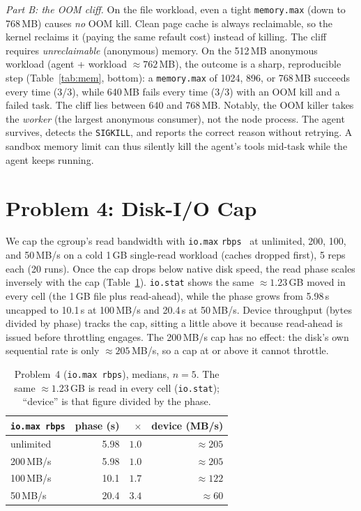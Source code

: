 \documentclass[10pt,conference]{IEEEtran}
\newcommand{\uu}[1]{\,\textsf{#1}}
\begin{document}
\emph{Part B: the OOM cliff.} On the file workload, even a tight
\texttt{memory.max} (down to 768\,MB) causes \emph{no} OOM kill. Clean page
cache is always reclaimable, so the kernel reclaims it (paying the same
refault cost) instead of killing. The cliff requires \emph{unreclaimable}
(anonymous) memory. On the 512\,MB anonymous workload (agent + workload
${\approx}762$\,MB), the outcome is a sharp, reproducible step
(Table~\ref{tab:mem}, bottom): a \texttt{memory.max} of 1024, 896, or 768\,MB
succeeds every time (3/3), while 640\,MB fails every time (3/3) with an OOM
kill and a failed task. The cliff lies between 640 and 768\,MB. Notably, the
OOM killer takes the \emph{worker} (the largest anonymous consumer), not the
node process. The agent survives, detects the \texttt{SIGKILL}, and reports
the correct reason without retrying. A sandbox memory limit can thus
silently kill the agent's tools mid-task while the agent keeps running.

\section{Problem 4: Disk-I/O Cap}
\label{sec:io}

We cap the cgroup's read bandwidth with \texttt{io.max}
\texttt{rbps}~\cite{cgroupv2} at unlimited, 200, 100, and 50\uu{MB/s} on a cold 1\,GB single-read workload
(caches dropped first), 5 reps each (20 runs). Once the cap drops below
native disk speed, the read phase scales inversely with the cap
(Table~\ref{tab:io}). \texttt{io.stat} shows the same ${\approx}1.23$\,GB
moved in every cell (the 1\,GB file plus read-ahead), while the phase grows
from 5.98\uu{s} uncapped to 10.1\uu{s} at 100\uu{MB/s} and 20.4\uu{s} at
50\uu{MB/s}. Device throughput (bytes divided by phase) tracks the cap,
sitting a little above it because read-ahead is issued before throttling
engages. The 200\uu{MB/s} cap has no effect: the disk's own sequential rate
is only ${\approx}205$\uu{MB/s}, so a cap at or above it cannot throttle.

\begin{table}[t]\centering\footnotesize
\setlength{\tabcolsep}{4pt}
\caption{Problem~4 (\texttt{io.max rbps}), medians, $n{=}5$. The same
${\approx}1.23$\,GB is read in every cell (\texttt{io.stat}); ``device''
is that figure divided by the phase.}
\label{tab:io}
\begin{tabular}{@{}lrrr@{}}
\toprule
\texttt{io.max rbps} & phase (s) & $\times$ & device (MB/s)\\
\midrule
unlimited    & 5.98 & $1.0$ & ${\approx}205$ \\
200\uu{MB/s} & 5.98 & $1.0$ & ${\approx}205$ \\
100\uu{MB/s} & 10.1 & $1.7$ & ${\approx}122$ \\
50\uu{MB/s}  & 20.4 & $3.4$ & ${\approx}60$ \\
\bottomrule
\end{tabular}
\end{table}
\end{document}
